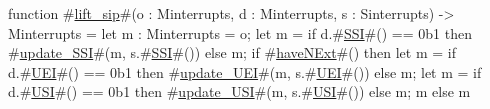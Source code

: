 function #\hyperref[sailRISCVzliftzysip]{lift\_sip}#(o : Minterrupts, d : Minterrupts, s : Sinterrupts) -> Minterrupts = {
  let m : Minterrupts = o;
  let m = if d.#\hyperref[sailRISCVzSSI]{SSI}#() == 0b1 then #\hyperref[sailRISCVzupdatezySSI]{update\_SSI}#(m, s.#\hyperref[sailRISCVzSSI]{SSI}#()) else m;
  if #\hyperref[sailRISCVzhaveNExt]{haveNExt}#() then {
    let m = if d.#\hyperref[sailRISCVzUEI]{UEI}#() == 0b1 then #\hyperref[sailRISCVzupdatezyUEI]{update\_UEI}#(m, s.#\hyperref[sailRISCVzUEI]{UEI}#()) else m;
    let m = if d.#\hyperref[sailRISCVzUSI]{USI}#() == 0b1 then #\hyperref[sailRISCVzupdatezyUSI]{update\_USI}#(m, s.#\hyperref[sailRISCVzUSI]{USI}#()) else m;
    m
  } else m
}
